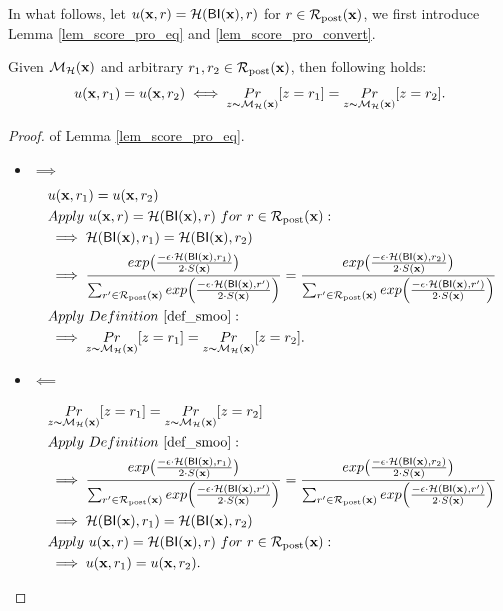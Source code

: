 \documentclass{article}
\begin{document}
In what follows, let $ \ux{r} = \hellinger(\bysinfer(\dataobs), r)$ for $r \in \candidateset{\dataobs}$, we first introduce Lemma \ref{lem_score_pro_eq} and \ref{lem_score_pro_convert}.

\begin{lem}
\label{lem_score_pro_eq}
  Given $\hexpmech(\dataobs)$ and arbitrary $r_1, r_2 \in \candidateset{\dataobs}$, then following holds:
  $$
  \ux{r_1} = \ux{r_2} \iff \hexpmechPr{\dataobs}{z = r_1} = \hexpmechPr{\dataobs}{z = r_2}.
  $$  
\end{lem}
\begin{proof} of Lemma \ref{lem_score_pro_eq}.
\begin{itemize}
  \item $\implies$
  \begin{equation*}
  \begin{split}
  & \ux{r_1} = \ux{r_2} \\
  & Apply\ \ux{r} = \hellinger(\bysinfer(\dataobs), r)\ for\ r \in \candidateset{\dataobs}:\\
  & \implies \hellinger(\bysinfer(\dataobs), r_1) = \hellinger(\bysinfer(\dataobs), r_2) \\
  & \implies \frac {exp\big(\frac{-\epsilon\cdot\hellinger(\bysinfer(\dataobs),r_1)}{2\cdot S(\dataobs)}\big)}{\nomalizer{\dataobs}} 
  = \frac {exp\big(\frac{-\epsilon\cdot\hellinger(\bysinfer(\dataobs),r_2)}{2\cdot S(\dataobs)}\big)}{\nomalizer{\dataobs}}\\
  & Apply\ Definition\ \ref{def_smoo} :\\
  & \implies \hexpmechPr{\dataobs}{z = r_1} = \hexpmechPr{\dataobs}{z = r_2}.
  \end{split}
  \end{equation*}


  \item $\impliedby$

    \begin{equation*}
  \begin{split}
  & \hexpmechPr{\dataobs}{z = r_1} = \hexpmechPr{\dataobs}{z = r_2} \\
  & Apply\ Definition\ \ref{def_smoo} :\\
  & \implies \frac {exp\big(\frac{-\epsilon\cdot\hellinger(\bysinfer(\dataobs),r_1)}{2\cdot S(\dataobs)}\big)}{\nomalizer{\dataobs}} 
  = \frac {exp\big(\frac{-\epsilon\cdot\hellinger(\bysinfer(\dataobs),r_2)}{2\cdot S(\dataobs)}\big)}{\nomalizer{\dataobs}}\\
  & \implies  \hellinger(\bysinfer(\dataobs), r_1) = \hellinger(\bysinfer(\dataobs), r_2) \\
  & Apply\ \ux{r} = \hellinger(\bysinfer(\dataobs), r)\ for\ r \in \candidateset{\dataobs}:\\
  & \implies \ux{r_1} = \ux{r_2}.
  \end{split}
  \end{equation*}
\end{itemize}

\end{proof}
\end{document}
